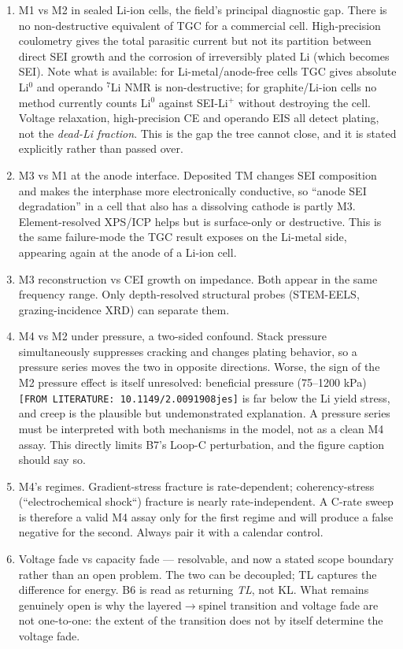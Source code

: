 \documentclass[11pt,a4paper]{article}
\begin{document}
\begin{enumerate}
  \item M1 vs M2 in sealed Li-ion cells, the field's principal diagnostic gap. There is no non-destructive equivalent of TGC for a commercial cell. High-precision coulometry gives the total parasitic current but not its partition between direct SEI growth and the corrosion of irreversibly plated Li (which becomes SEI). Note what is available: for Li-metal/anode-free cells TGC gives absolute Li\ensuremath{^{0}} and operando \ensuremath{^{7}}Li NMR is non-destructive; for graphite/Li-ion cells no method currently counts Li\ensuremath{^{0}} against SEI-Li\ensuremath{^{+}} without destroying the cell. Voltage relaxation, high-precision CE and operando EIS all detect plating, not the \emph{dead-Li fraction}. This is the gap the tree cannot close, and it is stated explicitly rather than passed over.
  \item M3 vs M1 at the anode interface. Deposited TM changes SEI composition and makes the interphase more electronically conductive, so \textquotedblleft{}anode SEI degradation\textquotedblright{} in a cell that also has a dissolving cathode is partly M3. Element-resolved XPS/ICP helps but is surface-only or destructive. This is the same failure-mode the TGC result exposes on the Li-metal side, appearing again at the anode of a Li-ion cell.
  \item M3 reconstruction vs CEI growth on impedance. Both appear in the same frequency range. Only depth-resolved structural probes (STEM-EELS, grazing-incidence XRD) can separate them.
  \item M4 vs M2 under pressure, a two-sided confound. Stack pressure simultaneously suppresses cracking and changes plating behavior, so a pressure series moves the two in opposite directions. Worse, the sign of the M2 pressure effect is itself unresolved: beneficial pressure (75--1200 kPa) \texttt{[FROM LITERATU}\hspace{0pt}\texttt{RE: 10.1149/2.}\hspace{0pt}\texttt{0091908jes]} is far below the Li yield stress, and creep is the plausible but undemonstrated explanation. A pressure series must be interpreted with both mechanisms in the model, not as a clean M4 assay. This directly limits B7's Loop-C perturbation, and the figure caption should say so.
  \item M4's regimes. Gradient-stress fracture is rate-dependent; coherency-stress (\textquotedblleft{}electrochemical shock\textquotedblleft{}) fracture is nearly rate-independent. A C-rate sweep is therefore a valid M4 assay only for the first regime and will produce a false negative for the second. Always pair it with a calendar control.
  \item Voltage fade vs capacity fade --- resolvable, and now a stated scope boundary rather than an open problem. The two can be decoupled; TL captures the difference for energy. B6 is read as returning \emph{TL}, not KL. What remains genuinely open is why the layered\ensuremath{\rightarrow}spinel transition and voltage fade are not one-to-one: the extent of the transition does not by itself determine the voltage fade.
\end{enumerate}
\end{document}
